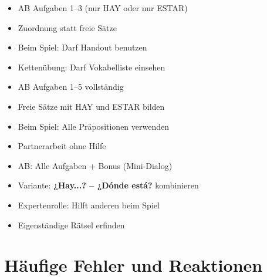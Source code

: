 \documentclass[11pt,a4paper]{article}
\newcommand{\es}[1]{\textbf{#1}}
\begin{document}
\begin{tcolorbox}[colback=white, colframe=basis, title=\textcolor{white}{\textbf{[B] Basis}}]
\begin{itemize}[nosep]
    \item AB Aufgaben 1--3 (nur HAY oder nur ESTAR)
    \item Zuordnung statt freie Sätze
    \item Beim Spiel: Darf Handout benutzen
    \item Kettenübung: Darf Vokabelliste einsehen
\end{itemize}
\end{tcolorbox}

\begin{tcolorbox}[colback=white, colframe=standard, title=\textcolor{white}{\textbf{[S] Standard}}]
\begin{itemize}[nosep]
    \item AB Aufgaben 1--5 vollständig
    \item Freie Sätze mit HAY und ESTAR bilden
    \item Beim Spiel: Alle Präpositionen verwenden
    \item Partnerarbeit ohne Hilfe
\end{itemize}
\end{tcolorbox}

\begin{tcolorbox}[colback=white, colframe=erweiterung, title=\textcolor{white}{\textbf{[E] Erweiterung}}]
\begin{itemize}[nosep]
    \item AB: Alle Aufgaben + Bonus (Mini-Dialog)
    \item Variante: \es{¿Hay...? -- ¿Dónde está?} kombinieren
    \item Expertenrolle: Hilft anderen beim Spiel
    \item Eigenständige Rätsel erfinden
\end{itemize}
\end{tcolorbox}

\vspace{0.5cm}

\section*{Häufige Fehler und Reaktionen}
\end{document}

